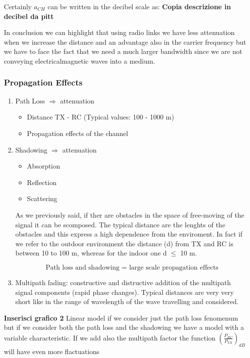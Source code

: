 Certainly $a_{CH}$ can be written in the decibel scale as:
\textbf{Copia descrizione in decibel da pitt}

In conclusion we can highlight that using radio links we have less attenuation when we increase the distance and an advantage also in the carrier frequency but we have to face the fact that we need a much larger bandwidth since we are not conveying electricalmagnetic waves into a medium.

\subsubsection{Propagation Effects }

\begin{enumerate}
\item Path Loss $\Rightarrow$ attenuation
\begin{itemize}
\item Distance TX - RC (Typical values: 100 - 1000 m)
\item Propagation effects of the channel
\end{itemize}
\item Shadowing $\Rightarrow$ attenuation
\begin{itemize}
\item Absorption
\item Reflection
\item Scattering
\end{itemize}

As we previously said, if ther are obstacles in the space of free-moving of the signal it can be scomposed. The typical distance are the lenghts of the obstacles and this express a high dependence from the enviroment. In fact if we refer to the outdoor environment the distance (d) from TX and RC is between 10 to 100 m, whereas for the indoor one d $\leq$ 10 m.

$$\text{Path loss and shadowing = large scale propagation effects}$$
\item Multipath fading: constructive and distructive addition of the multipath signal components (rapid phase changes).
Typical distances are very very short like in the range of wavelength of the wave travelling and considered.
\end{enumerate}

\textbf{Inserisci grafico 2}
Linear model if we consider just the path loss fenomenum but if we consider both the path loss and the shadowing we have a model with a variable characteristic. If we add also the multipath factor the function $(\frac{P_{RC}}{P_{TX}})_{dB}$ will have even more flactuations
